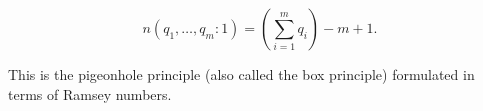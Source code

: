 $$n(q_1, \ldots, q_m : 1) = \left( \sum_{i=1}^{m} q_i \right) - m + 1.$$

This is the pigeonhole principle (also called the box principle) formulated in terms of Ramsey numbers.
